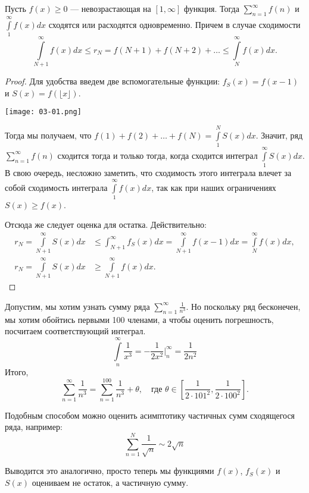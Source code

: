 \documentclass[a4paper, 12pt]{article}
\begin{document}
\begin{Test}

Пусть $f(x) \geqslant 0$ --- невозрастающая на $[1, \infty]$ функция. Тогда $\sum\limits_{n=1}^{\infty}f(n)$ и $\int\limits_1^{\infty}f(x)dx$ сходятся или расходятся одновременно. Причем в случае сходимости
$$
\int\limits_{N+1}^{\infty}f(x)dx \leqslant r_N = f(N+1) + f(N+2) + \ldots \leqslant \int\limits_N^\infty f(x)dx.
$$
\end{Test}

\begin{proof}
Для удобства введем две вспомогательные функции: $f_S(x) = f(x-1)$ и $S(x) = f(\lfloor x \rfloor)$.

\begin{center}
\texttt{[image: 03-01.png]}
\end{center}

Тогда мы получаем, что $f(1) + f(2) + \ldots + f(N) = \int\limits_1^N S(x)dx$. Значит, ряд $\sum\limits_{n=1}^\infty f(n)$ сходится тогда и только тогда, когда сходится интеграл $\int\limits_1^\infty S(x)dx$. В свою очередь, несложно заметить, что сходимость этого интеграла влечет за собой сходимость интеграла $\int\limits^\infty_1 f(x)dx$, так как  при наших ограничениях $S(x) \geqslant f(x)$.

Отсюда же следует оценка для остатка. Действительно:
\begin{align*}
r_{N} = \int\limits_{N+1}^\infty S(x) dx & \leqslant \int_{N+1}^\infty f_S(x)dx = \int\limits_{N+1}^\infty f(x-1)dx = \int\limits_N^\infty f(x)dx, \\
r_{N} = \int\limits_{N+1}^\infty S(x)dx & \geqslant \int\limits_{N+1}^{\infty}f(x)dx.
\end{align*}
\end{proof}

\begin{Examples}
Допустим, мы хотим узнать сумму ряда $\sum\limits_{n=1}^{\infty}\frac{1}{n^3}$. Но поскольку ряд бесконечен, мы хотим обойтись первыми 100 членами, а чтобы оценить погрешность, посчитаем соответствующий интеграл.
$$
\int\limits_{n}^\infty \frac{1}{x^3} = -\frac{1}{2x^2} \Big|^\infty_{n} = \frac{1}{2n^2}
$$
Итого,
$$
\sum\limits_{n=1}^{\infty}\frac{1}{n^3} = \sum\limits_{n=1}^{100}\frac{1}{n^3} + \theta, \quad \text{где } \theta \in \left[\frac{1}{2\cdot101^2}, \frac{1}{2\cdot 100^2}\right].
$$

\end{Examples}

Подобным способом можно оценить асимптотику частичных сумм сходящегося ряда, например:
$$
\sum_{n=1}^{N} \frac{1}{\sqrt{n}} \sim 2\sqrt{n}
$$

Выводится это аналогично, просто теперь мы функциями $f(x)$, $f_S(x)$ и $S(x)$ оцениваем не остаток, а частичную сумму.
\end{document}
